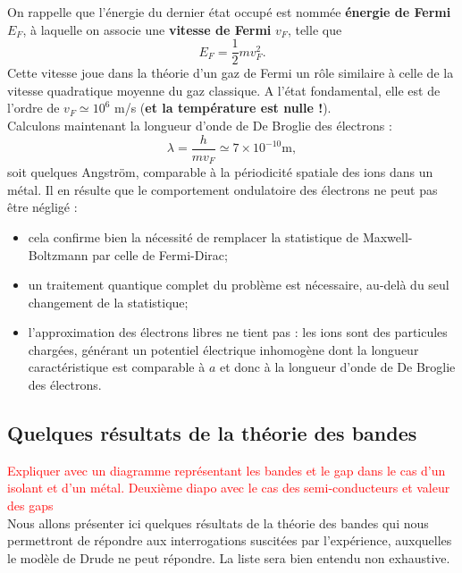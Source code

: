 \documentclass[11pt,a4paper]{report}
\begin{document}
On rappelle que l'énergie du dernier état occupé est nommée \textbf{énergie de Fermi} $E_F$, à laquelle on associe une \textbf{vitesse de Fermi} $v_F$, telle que
\begin{equation}
	E_F = \frac{1}{2}m v_F^2.
\end{equation}
Cette vitesse joue dans la théorie d'un gaz de Fermi un rôle similaire à celle de la vitesse quadratique moyenne du gaz classique. A l'état fondamental, elle est de l'ordre de $v_F \simeq 10^6$ m/s (\textbf{et la température est nulle !}).\\

Calculons maintenant la longueur d'onde de De Broglie des électrons :
\begin{equation}
	\lambda = \frac{h}{m v_F} \simeq 7\times 10^{-10} \text{m},
\end{equation}
soit quelques Angström, comparable à la périodicité spatiale des ions dans un métal. Il en résulte que le comportement ondulatoire des électrons ne peut pas être négligé :
\begin{itemize}
	\item cela confirme bien la nécessité de remplacer la statistique de Maxwell-Boltzmann par celle de Fermi-Dirac;
	\item un traitement quantique complet du problème est nécessaire, au-delà du seul changement de la  statistique;
	\item l'approximation des électrons libres ne tient pas : les ions sont des particules chargées, générant un potentiel électrique inhomogène dont la longueur caractéristique est comparable à $a$ et donc à la longueur d'onde de De Broglie des électrons.
\end{itemize}

\subsection{Quelques résultats de la théorie des bandes}

\textcolor{red}{Expliquer avec un diagramme représentant les bandes et le gap dans le cas d'un isolant et d'un métal. Deuxième diapo avec le cas des semi-conducteurs et valeur des gaps}\\

Nous allons présenter ici quelques résultats de la théorie des bandes qui nous permettront de répondre aux interrogations suscitées par l'expérience, auxquelles le modèle de Drude ne peut répondre. La liste sera bien entendu non exhaustive.\\
\end{document}
